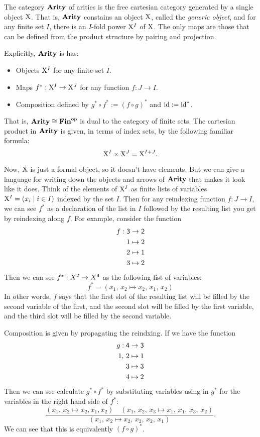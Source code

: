 \documentclass[DynamicalBook]{subfiles}
\begin{document}
\begin{definition}
  The category $\textbf{Arity}$ of arities is the free cartesian category generated by
  a single object $\mathrm{X}$. That is, $\textbf{Arity}$ constains an object $\mathrm{X}$, called
  the \emph{generic object}, and for any finite set $I$, there is an $I$-fold
  power $\mathrm{X}^I$ of $\mathrm{X}$. The only maps are those that can be defined from the
  product structure by pairing and projection.
  
  Explicitly, $\textbf{Arity}$ is has:
\begin{itemize}
  \item Objects $\mathrm{X}^{I}$ for any finite set $I$.
  \item Maps $f^{\ast} : \mathrm{X}^{I} \to \mathrm{X}^{J}$ for any function $f : J \to I$.
  \item Composition defined by $g^{\ast} \circ f^{\ast} := (f \circ g)^{\ast}$
    and $\mathrm{id} := \mathrm{id}^{\ast}$.
\end{itemize}
That is, $\textbf{Arity} \cong \textbf{Fin}^{\textnormal{op}}$ is dual to the category of finite sets.
The cartesian product in $\textbf{Arity}$ is given, in terms of index sets, by the following familiar formula:
$$\mathrm{X}^I \times \mathrm{X}^J = \mathrm{X}^{I + J}.$$
\end{definition}

Now, $\mathrm{X}$ is just a formal object, so it doesn't have elements. But we can give
a language for writing down the objects and arrows  of $\textbf{Arity}$ that makes it
look like it does.
Think of the elements of $\mathrm{X}^I$ as finite lists of variables $\mathrm{X}^I = (x_i \mid i \in
I)$ indexed by the set $I$. Then for any reindexing function $f : J \to I$, we
can see $f^{\ast}$ as a declaration of the list in $I$ followed by the resulting
list you get by reindexing along $f$. For example,
consider the function 
\begin{align*}
  f : \mathsf{3} &\to \mathsf{2} \\
1 &\mapsto 2 \\
2 &\mapsto 1 \\
3 &\mapsto 2
\end{align*}
Then we can see $f^{\ast} : X^{\mathsf{2}} \to X^{\mathsf{3}}$ as the following list
of variables:
$$f^{\ast} = (x_1,\, x_2 \mapsto x_2,\, x_1,\, x_2)$$
In other words, $f$ says that the first slot of the resulting list will be
filled by the second variable of the first, and the second slot will be filled
by the first variable, and the third slot will be filled by the second variable.

Composition is given by propagating the reindxing. If we have the function
\begin{align*}
  g : \mathsf{4} &\to \mathsf{3} \\
  1,\, 2 &\mapsto 1 \\
  3 &\mapsto 3 \\
  4 &\mapsto 2
\end{align*}
Then we can see calculate $g^{\ast} \circ f^{\ast}$ by substituting variables
using in $g^{\ast}$ for the variables in the right hand side of $f^{\ast}$:
$$\frac{(x_1,\, x_2 \mapsto x_2, x_1, x_2)\quad (x_1,\, x_2,\, x_3 \mapsto x_1,\,
  x_1,\, x_3,\, x_2)}{(x_1,\, x_2 \mapsto x_2,\, x_2,\, x_2,\, x_1)}.$$
We can see that this is equivalently $(f \circ g)^{\ast}$.
\end{document}
